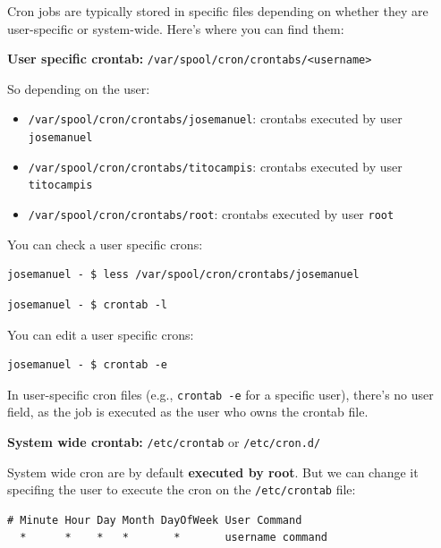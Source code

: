 \documentclass{article}
\newenvironment{blocktemplateII}[1]{%
    \tcolorbox[beamer,%
    noparskip,breakable,
    colframe=Green,%
    colbacklower=LimeGreen!75!LightGreen,%
    title=#1]}%
    {\endtcolorbox}
\newenvironment{codetemplate}[1][]{%
  \mybasecolorbox[#1]
  \itshape
}{%
  \endmybasecolorbox
}
\begin{document}
Cron jobs are typically stored in specific files depending on whether they are user-specific or system-wide. Here’s where you can find them:

\textbf{User specific crontab:} \verb|/var/spool/cron/crontabs/<username>|

So depending on the user:
\begin{itemize}
    \item \verb|/var/spool/cron/crontabs/josemanuel|: crontabs executed by user \verb|josemanuel| 
    \item \verb|/var/spool/cron/crontabs/titocampis|: crontabs executed by user \verb|titocampis|
    \item \verb|/var/spool/cron/crontabs/root|: crontabs executed by user \verb|root| 
\end{itemize}

You can check a user specific crons:
\begin{codetemplate}{}
\begin{verbatim}
josemanuel - $ less /var/spool/cron/crontabs/josemanuel
\end{verbatim}
\end{codetemplate}

\begin{codetemplate}{}
\begin{verbatim}
josemanuel - $ crontab -l
\end{verbatim}
\end{codetemplate}

You can edit a user specific crons:
\begin{codetemplate}{}
\begin{verbatim}
josemanuel - $ crontab -e
\end{verbatim}
\end{codetemplate}

\begin{blocktemplateII}{NOTE}
In user-specific cron files (e.g., \verb|crontab -e| for a specific user), there’s no user field, as the job is executed as the user who owns the crontab file.
\end{blocktemplateII}

\textbf{System wide crontab:} \verb|/etc/crontab| or \verb|/etc/cron.d/|

System wide cron are by default \textbf{executed by root}. But we can change it specifing the user to execute the cron on the \verb|/etc/crontab| file:
\begin{codetemplate}{}
\begin{verbatim}
# Minute Hour Day Month DayOfWeek User Command
  *      *    *   *       *       username command
\end{verbatim}
\end{codetemplate}
\end{document}

